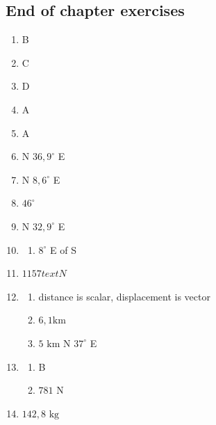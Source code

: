 \subsection{End of chapter exercises}
\begin{multicols}{3}
 \begin{enumerate}[noitemsep, label=\textbf{(\arabic*)} ]
  \item B
\item C
  \item D
\item A
  \item A
\item N $36,9^{\circ}$ E
\item N $8,6^{\circ}$ E
\item $46^{\circ}$
\item N $32,9^{\circ}$ E
\item %
\begin{enumerate}[noitemsep, label=\textbf{(\alph*)} ]
 \item $8^{\circ}$ E of S
\end{enumerate}
\item $1157 text{N}$
\item %
\begin{enumerate}[noitemsep, label=\textbf{(\alph*)} ]
 \item distance is scalar, displacement is vector
\item $6,1 \text{km}$
\item $5 \text{ km}$ N $37^{\circ}$ E
\end{enumerate}
\item %
\begin{enumerate}[noitemsep, label=\textbf{(\alph*)} ]
 \item B
\item $781 \text{ N}$
\end{enumerate}
\item $142,8 \text{ kg}$
 \end{enumerate}
\end{multicols}

